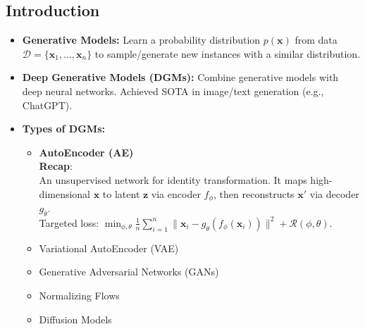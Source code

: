 \documentclass[UTF8]{ctexart}
\begin{document}
\subsection{Introduction}
\begin{itemize}
    \item \textbf{Generative Models:} Learn a probability distribution $p(\mathbf{x})$ from data $\mathcal{D} = \{\mathbf{x}_1, \dots, \mathbf{x}_n\}$ to sample/generate new instances with a similar distribution.
    \item \textbf{Deep Generative Models (DGMs):} Combine generative models with deep neural networks. Achieved SOTA in image/text generation (e.g., ChatGPT).
    \item \textbf{Types of DGMs:}
    \begin{itemize}
        \item \textbf{AutoEncoder (AE)}\\
        \textbf{Recap}: \\ 
        An unsupervised network for identity transformation. 
        It maps high-dimensional $\mathbf{x}$ to latent $\mathbf{z}$ 
        via encoder $f_\phi$, then reconstructs $\mathbf{x}'$ via decoder $g_\theta$. \\
        Targeted loss:
         $\min_{\phi,\theta} \frac{1}{n} \sum_{i=1}^n \|\mathbf{x}_i - g_\theta(f_\phi(\mathbf{x}_i))\|^2 + \mathcal{R}(\phi, \theta)$.
        \item Variational AutoEncoder (VAE)
        \item Generative Adversarial Networks (GANs)
        \item Normalizing Flows
        \item Diffusion Models
    \end{itemize}
\end{itemize}
\end{document}
